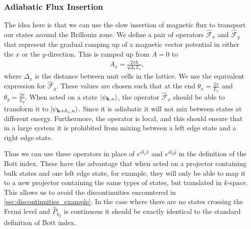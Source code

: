 \subsubsection{Adiabatic Flux Insertion}

The idea here is that we can use the slow insertion of magnetic flux to transport our states around the Brillouin zone. We define a pair of operators $\hat{\mathcal{F}}_x$ and $\hat{\mathcal{F}}_y$ that represent the gradual ramping up of a magnetic vector potential in either the $x$ or the $y$-direction. This is ramped up from $A = 0$ to 
\begin{align}
	A_x = \frac{2\pi\hbar}{q \Delta_x L_x},
\end{align}
where $\Delta_x$ is the distance between unit cells in the lattice. We use the equivalent expression for $\hat{\mathcal F}_y$. These values are chosen such that at the end $\theta_x = \frac{2\pi}{L_x}$ and $\theta_y = \frac{2\pi}{L_y}$. When acted on a state $\ket{\psi_{\textbf{k}, n}}$, the operator $\hat{\mathcal{F}}_x$ should be able to transform it to $\ket{\psi_{\textbf{k} + \delta_x, n}}$. Since it is adiabatic it will not mix between states  at different energy. Furthermore, the operator is local, and this should ensure that in a large system it is prohibited from mixing between a left edge state and a right edge state.\par
Thus we can use these operators in place of $e^{i \delta_x \hat x}$ and $e^{i \delta_y \hat y}$ in the definition of the Bott index. These have the advantage that when acted on a projector containing bulk states and one left edge state, for example, they will only be able to map it to a new projector containing the same types of states, but translated in $k$-space. This allows us to avoid the discontinuities encountered in \textsection\ref{sec:discontinuities_example}. In the case where there are no states crossing the Fermi level and $\hat P_{k_y}$ is continuous it should be exactly identical to the standard definition of Bott index.

